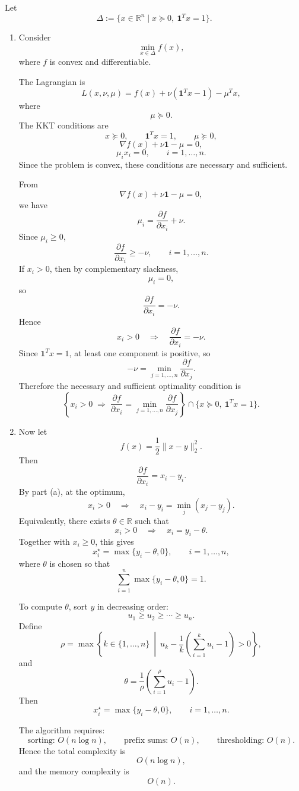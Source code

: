 \documentclass[11pt,letter,notitlepage]{article}
\theoremstyle{definition}
\begin{document}
\begin{solution}

Let
\[
\Delta:=\{x\in\mathbb R^n\mid x\succeq 0,\ \mathbf 1^Tx=1\}.
\]

\begin{enumerate}[label=(\alph*)]

\item
Consider
\[
\min_{x\in\Delta} f(x),
\]
where \(f\) is convex and differentiable.

The Lagrangian is
\[
L(x,\nu,\mu)=f(x)+\nu(\mathbf 1^Tx-1)-\mu^Tx,
\]
where
\[
\mu\succeq 0.
\]
The KKT conditions are
\[
x\succeq 0,\qquad \mathbf 1^Tx=1,\qquad \mu\succeq 0,
\]
\[
\nabla f(x)+\nu \mathbf 1-\mu=0,
\]
\[
\mu_i x_i=0,\qquad i=1,\dots,n.
\]
Since the problem is convex, these conditions are necessary and sufficient.

From
\[
\nabla f(x)+\nu \mathbf 1-\mu=0,
\]
we have
\[
\mu_i=\frac{\partial f}{\partial x_i}+\nu.
\]
Since \(\mu_i\ge 0\),
\[
\frac{\partial f}{\partial x_i}\ge -\nu,\qquad i=1,\dots,n.
\]
If \(x_i>0\), then by complementary slackness,
\[
\mu_i=0,
\]
so
\[
\frac{\partial f}{\partial x_i}=-\nu.
\]
Hence
\[
x_i>0
\quad\Longrightarrow\quad
\frac{\partial f}{\partial x_i}=-\nu.
\]
Since \(\mathbf 1^Tx=1\), at least one component is positive, so
\[
-\nu=\min_{j=1,\dots,n}\frac{\partial f}{\partial x_j}.
\]
Therefore the necessary and sufficient optimality condition is
\[
\left\{
x_i>0
\;\Longrightarrow\;
\frac{\partial f}{\partial x_i}
=
\min_{j=1,\dots,n}\frac{\partial f}{\partial x_j}
\right\}
\cap
\{x\succeq 0,\ \mathbf 1^Tx=1\}.
\]

\item
Now let
\[
f(x)=\frac12\|x-y\|_2^2.
\]
Then
\[
\frac{\partial f}{\partial x_i}=x_i-y_i.
\]
By part (a), at the optimum,
\[
x_i>0
\quad\Longrightarrow\quad
x_i-y_i=\min_j(x_j-y_j).
\]
Equivalently, there exists \(\theta\in\mathbb R\) such that
\[
x_i>0
\quad\Longrightarrow\quad
x_i=y_i-\theta.
\]
Together with \(x_i\ge 0\), this gives
\[
x_i^\star=\max\{y_i-\theta,0\},\qquad i=1,\dots,n,
\]
where \(\theta\) is chosen so that
\[
\sum_{i=1}^n \max\{y_i-\theta,0\}=1.
\]

To compute \(\theta\), sort \(y\) in decreasing order:
\[
u_1\ge u_2\ge \cdots \ge u_n.
\]
Define
\[
\rho
=
\max\left\{
k\in\{1,\dots,n\}\ \middle|\
u_k-\frac{1}{k}\left(\sum_{i=1}^k u_i-1\right)>0
\right\},
\]
and
\[
\theta=\frac{1}{\rho}\left(\sum_{i=1}^{\rho}u_i-1\right).
\]
Then
\[
x_i^\star=\max\{y_i-\theta,0\},\qquad i=1,\dots,n.
\]

The algorithm requires:
\[
\text{sorting: }O(n\log n),
\qquad
\text{prefix sums: }O(n),
\qquad
\text{thresholding: }O(n).
\]
Hence the total complexity is
\[
O(n\log n),
\]
and the memory complexity is
\[
O(n).
\]


\end{enumerate}
\end{solution}
\end{document}
